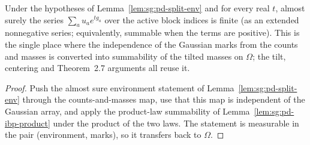 \begin{lemma}\label{lem:sg:pd-tilt-summable-blocks}
  \leanok
  Under the hypotheses of Lemma~\ref{lem:sg:pd-split-env} and for every real $t$, almost surely the series $\sum_a u_ae^{tg_a}$ over the active block indices is finite (as an extended nonnegative series; equivalently, summable when the terms are positive). This is the single place where the independence of the Gaussian marks from the counts and masses is converted into summability of the tilted masses on $\Omega$; the tilt, centering and Theorem~2.7 arguments all reuse it.
\end{lemma}
\begin{proof}
  \leanok
Push the almost sure environment statement of Lemma~\ref{lem:sg:pd-split-env} through the counts-and-masses map, use that this map is independent of the Gaussian array, and apply the product-law summability of Lemma~\ref{lem:sg:pd-ibp-product} under the product of the two laws. The statement is measurable in the pair (environment, marks), so it transfers back to $\Omega$.
\end{proof}

